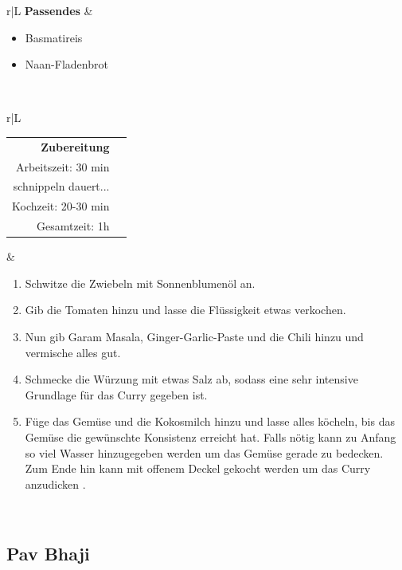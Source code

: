 \documentclass[a4paper, 12pt]{scrbook} 								%
\numberwithin{equation}{section} 									%
\begin{document}
\begin{tabularx}{\textwidth}{r|L}
				\textbf{Passendes}		&	\begin{itemize}[nosep]
												\item Basmatireis
												\item Naan-Fladenbrot
											\end{itemize}	\\
			\end{tabularx}
			\newpage
			\begin{tabularx}{\textwidth}{r|L}	


				\begin{tabular}[t]{rr}
					\textbf{Zubereitung}	\\
					Arbeitszeit: 30 min \\ 
					schnippeln dauert...	\\
					Kochzeit: 20-30 min \\
					Gesamtzeit:	1h 		\\
				\end{tabular}			&	\begin{enumerate}[nosep]
												\item Schwitze die Zwiebeln mit Sonnenblumenöl an.
												\item Gib die Tomaten hinzu und lasse die Flüssigkeit etwas verkochen.
												\item Nun gib Garam Masala, Ginger-Garlic-Paste und die Chili hinzu und vermische alles gut.
												\item Schmecke die Würzung mit etwas Salz ab, sodass eine sehr intensive Grundlage für das Curry gegeben ist.
												\item Füge das Gemüse und die Kokosmilch hinzu und lasse alles köcheln, bis das Gemüse die gewünschte Konsistenz erreicht hat. Falls nötig kann zu Anfang so viel Wasser hinzugegeben werden um das Gemüse gerade zu bedecken. Zum Ende hin kann mit offenem Deckel gekocht werden um das Curry anzudicken .
											\end{enumerate}	\\
			\end{tabularx}
			\newpage


			\subsection{Pav Bhaji}	\label{pav_bhaji}
\end{document}
